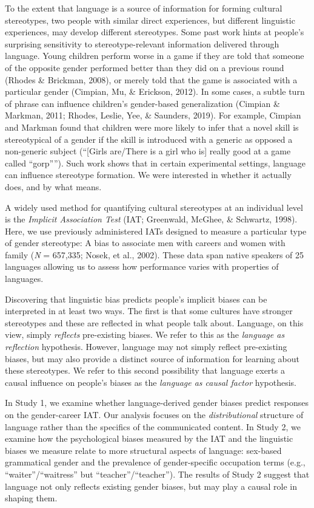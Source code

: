 \documentclass[9pt,twocolumn,twoside,lineno]{pnas-new}
\begin{document}
To the extent that language is a source of information for forming
cultural stereotypes, two people with similar direct experiences, but
different linguistic experiences, may develop different stereotypes.
Some past work hints at people's surprising sensitivity to
stereotype-relevant information delivered through language. Young
children perform worse in a game if they are told that someone of the
opposite gender performed better than they did on a previous round
(Rhodes \& Brickman, 2008), or merely told that the game is associated
with a particular gender (Cimpian, Mu, \& Erickson, 2012). In some
cases, a subtle turn of phrase can influence children's gender-based
generalization (Cimpian \& Markman, 2011; Rhodes, Leslie, Yee, \&
Saunders, 2019). For example, Cimpian and Markman found that children
were more likely to infer that a novel skill is stereotypical of a
gender if the skill is introduced with a generic as opposed a
non-generic subject (``{[}Girls are/There is a girl who is{]} really
good at a game called \enquote{gorp''}). Such work shows that in certain
experimental settings, language can influence stereotype formation. We
were interested in whether it actually does, and by what means.

A widely used method for quantifying cultural stereotypes at an
individual level is the \emph{Implicit Association Test} (IAT;
Greenwald, McGhee, \& Schwartz, 1998). Here, we use previously
administered IATs designed to measure a particular type of gender
stereotype: A bias to associate men with careers and women with family
(\emph{N} = 657,335; Nosek, et al., 2002). These data span native
speakers of 25 languages allowing us to assess how performance varies
with properties of languages.

Discovering that linguistic bias predicts people's implicit biases can
be interpreted in at least two ways. The first is that some cultures
have stronger stereotypes and these are reflected in what people talk
about. Language, on this view, simply \emph{reflects} pre-existing
biases. We refer to this as the \emph{language as reflection}
hypothesis. However, language may not simply reflect pre-existing
biases, but may also provide a distinct source of information for
learning about these stereotypes. We refer to this second possibility
that language exerts a causal influence on people's biases as the
\emph{language as causal factor} hypothesis.

In Study 1, we examine whether language-derived gender biases predict
responses on the gender-career IAT. Our analysis focuses on the
\emph{distributional} structure of language rather than the specifics of
the communicated content. In Study 2, we examine how the psychological
biases measured by the IAT and the linguistic biases we measure relate
to more structural aspects of language: sex-based grammatical gender and
the prevalence of gender-specific occupation terms (e.g.,
\enquote{waiter}/\enquote{waitress} but
\enquote{teacher}/\enquote{teacher}). The results of Study 2 suggest
that language not only reflects existing gender biases, but may play a
causal role in shaping them.
\end{document}
